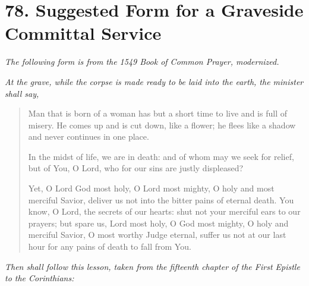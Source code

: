 \documentclass[
]{book}
\begin{document}
\hypertarget{suggested-form-for-a-graveside-committal-service}{%
\section*{78. Suggested Form for a Graveside Committal Service}\label{suggested-form-for-a-graveside-committal-service}}

\protect\hypertarget{chapter-slug-78-suggested-form-for-a-graveside-committal-service}{\href{}{}}

\protect\hypertarget{78}{\href{}{}}\emph{The following form is from the 1549 Book of Common Prayer, modernized.}

\emph{At the grave, while the corpse is made ready to be laid into the earth, the minister shall say,}

\begin{quote}
Man that is born of a woman has but a short time to live and is full of misery. He comes up and is cut down, like a flower; he flees like a shadow and never continues in one place.

In the midst of life, we are in death: and of whom may we seek for relief, but of You, O Lord, who for our sins are justly displeased?

Yet, O Lord God most holy, O Lord most mighty, O holy and most merciful Savior, deliver us not into the bitter pains of eternal death. You know, O Lord, the secrets of our hearts: shut not your merciful ears to our prayers; but spare us, Lord most holy, O God most mighty, O holy and merciful Savior, O most worthy Judge eternal, suffer us not at our last hour for any pains of death to fall from You.
\end{quote}

\emph{Then shall follow this lesson, taken from the fifteenth chapter of the First Epistle to the Corinthians:}
\end{document}
